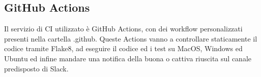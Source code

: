 \subsection{GitHub Actions}
Il servizio di CI utilizzato è GitHub Actions, con dei workflow personalizzati presenti nella cartella .github. Queste Actions vanno a controllare staticamente il codice tramite Flake8, ad eseguire il codice ed i test su MacOS, Windows ed Ubuntu ed infine mandare una notifica della buona o cattiva riuscita sul canale predisposto di Slack.